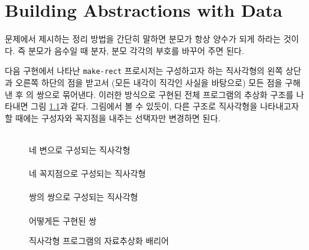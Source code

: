 \chapter{\Large{Building Abstractions with Data}}


문제에서 제시하는 정리 방법을 간단히 말하면 분모가 항상 양수가 되게 하라는
것이다. 즉 분모가 음수일 때 분자, 분모 각각의 부호를 바꾸어 주면 된다.





다음 구현에서 나타난 \texttt{make-rect} 프로시저는 구성하고자 하는 직사각형의
왼쪽 상단과 오른쪽 하단의 점을 받고서
(모든 내각이 직각인 사실을 바탕으로) 모든 점을 구해낸 후 의 쌍으로
묶어낸다. 이러한 방식으로 구현된 전체 프로그램의 추상화 구조를 나타내면 그림
\ref{fig:absrect}과 같다. 그림에서 볼 수 있듯이, 다른 구조로 직사각형을
나타내고자 할 때에는 구성자와 꼭지점을 내주는 선택자만 변경하면 된다.
\begin{figure}[t]
  \centering
  \HR{2em}\HR{2em}\vspace{1em}\\
  네 변으로 구성되는 직사각형 \vspace{1em}\\
  \HR{4em}\HR{4em}\vspace{1em}\\
  네 꼭지점으로 구성되는 직사각형 \vspace{1em}\\
  \HR{3em}\HR{3em}\vspace{1em}\\
  쌍의 쌍으로 구성되는 직사각형 \vspace{1em}\\
  \HR{11em}\HR{11em}\vspace{1em}\\
  어떻게든 구현된 쌍\vspace{1em}\\
  \caption{직사각형 프로그램의 자료추상화 배리어}
  \label{fig:absrect}
\end{figure}


